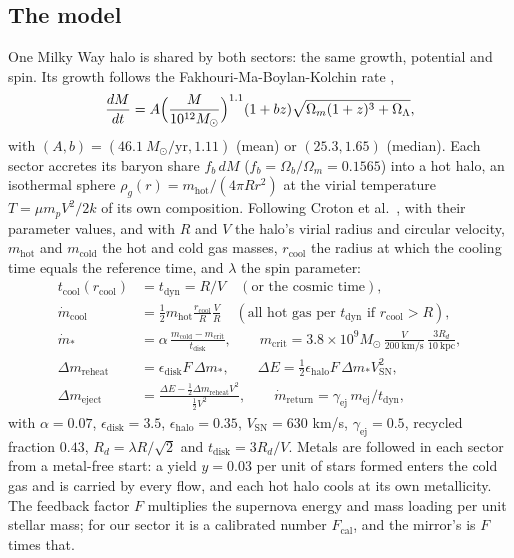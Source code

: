 \documentclass[11pt]{article}
\theoremstyle{definition}
\theoremstyle{plain}
\providecommand{\Msun}{}\renewcommand{\Msun}{M_{\odot}}
\providecommand{\kpc}{}\renewcommand{\kpc}{\mathrm{kpc}}
\begin{document}
\subsection*{The model}
\label{c:note.simulations.setting-model}
One Milky Way halo is shared by both sectors: the same growth, potential and spin. Its growth follows the Fakhouri-Ma-Boylan-Kolchin rate \cite{Fakhouri2010},
\[
\frac{dM}{dt} = A\Bigl(\frac{M}{10^{12}\Msun}\Bigr)^{1.1}(1 + bz)\sqrt{\Omega_{m}(1+z)^{3} + \Omega_{\Lambda}},
\]
with $(A, b) = (46.1\ \Msun/\mathrm{yr}, 1.11)$ (mean) or $(25.3, 1.65)$ (median). Each sector accretes its baryon share $f_{b}\,dM$ ($f_{b} = \Omega_{b}/\Omega_{m} = 0.1565$) into a hot halo, an isothermal sphere $\rho_{g}(r) = m_{\mathrm{hot}}/(4\pi Rr^{2})$ at the virial temperature $T = \mu m_{p}V^{2}/2k$ of its own composition. Following Croton et al.\ \cite{Croton2006}, with their parameter values, and with $R$ and $V$ the halo's virial radius and circular velocity, $m_{\mathrm{hot}}$ and $m_{\mathrm{cold}}$ the hot and cold gas masses, $r_{\mathrm{cool}}$ the radius at which the cooling time equals the reference time, and $\lambda$ the spin parameter:
\begin{align*}
t_{\mathrm{cool}}(r_{\mathrm{cool}}) &= t_{\mathrm{dyn}} = R/V \quad (\text{or the cosmic time}),\\
\dot m_{\mathrm{cool}} &= \tfrac{1}{2}m_{\mathrm{hot}}\frac{r_{\mathrm{cool}}}{R}\frac{V}{R} \quad (\text{all hot gas per } t_{\mathrm{dyn}} \text{ if } r_{\mathrm{cool}} > R),\\
\dot m_{*} &= \alpha\,\frac{m_{\mathrm{cold}} - m_{\mathrm{crit}}}{t_{\mathrm{disk}}}, \qquad
m_{\mathrm{crit}} = 3.8 \times 10^{9}\Msun\,\frac{V}{200\ \mathrm{km/s}}\,\frac{3R_{d}}{10\ \kpc},\\
\Delta m_{\mathrm{reheat}} &= \epsilon_{\mathrm{disk}}F\,\Delta m_{*}, \qquad
\Delta E = \tfrac{1}{2}\epsilon_{\mathrm{halo}}F\,\Delta m_{*}V_{\mathrm{SN}}^{2},\\
\Delta m_{\mathrm{eject}} &= \frac{\Delta E - \tfrac{1}{2}\Delta m_{\mathrm{reheat}}V^{2}}{\tfrac{1}{2}V^{2}}, \qquad
\dot m_{\mathrm{return}} = \gamma_{\mathrm{ej}}\,m_{\mathrm{ej}}/t_{\mathrm{dyn}},
\end{align*}
with $\alpha = 0.07$, $\epsilon_{\mathrm{disk}} = 3.5$, $\epsilon_{\mathrm{halo}} = 0.35$, $V_{\mathrm{SN}} = 630$ km/s, $\gamma_{\mathrm{ej}} = 0.5$, recycled fraction $0.43$, $R_{d} = \lambda R/\sqrt{2}$ and $t_{\mathrm{disk}} = 3R_{d}/V$. Metals are followed in each sector from a metal-free start: a yield $y = 0.03$ per unit of stars formed enters the cold gas and is carried by every flow, and each hot halo cools at its own metallicity. The feedback factor $F$ multiplies the supernova energy and mass loading per unit stellar mass; for our sector it is a calibrated number $F_{\mathrm{cal}}$, and the mirror's is $F$ times that.
\end{document}
